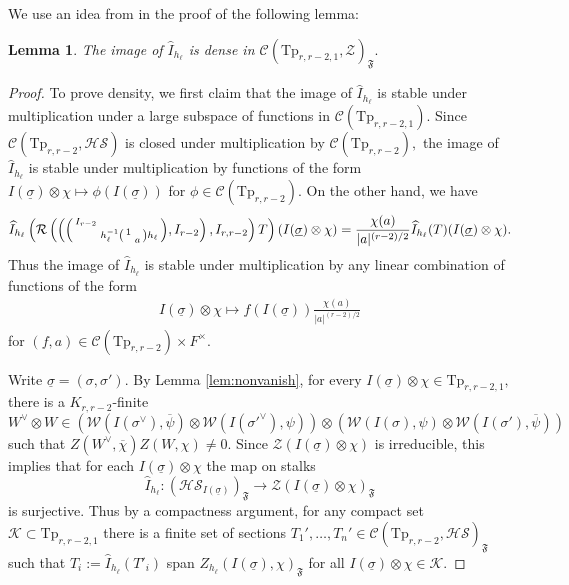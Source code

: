 \documentclass[12pt]{amsart}
\newtheorem{lem}[thm]{Lemma}
\theoremstyle{remark}
\numberwithin{equation}{section}
\newcommand{\lto}{\longrightarrow}
\theoremstyle{definition}
\newenvironment{psmatrix}
  {\left(\begin{smallmatrix}}
  {\end{smallmatrix}\right)}
\renewcommand{\bar}{\overline}
\numberwithin{equation}{subsection}
\begin{document}
We use an idea from \cite{RB:quest} in the proof of the following lemma:
\begin{lem}\label{lem:dense}
The image of $\widehat{I}_{h_\ell}$ is dense in $\mathcal{C}(\mathrm{Tp}_{r,r-2,1},\mathcal{Z})_{\mathfrak{F}}.$
\end{lem}

\begin{proof}
To prove density, we first claim that the image of $\widehat{I}_{h_\ell}$ is stable under multiplication under a large subspace of functions in $\mathcal{C}(\mathrm{Tp}_{r,r-2,1})$. Since $\mathcal{C}(\mathrm{Tp}_{r,r-2},\mathcal{HS})$ is closed under multiplication by $\mathcal{C}(\mathrm{Tp}_{r,r-2}),$ the image of $\widehat{I}_{h_\ell}$ is stable under multiplication by functions of the form $I(\underline{\sigma}) \otimes \chi \mapsto \phi(I(\underline{\sigma}))$ for $\phi \in \mathcal{C}(\mathrm{Tp}_{r,r-2}).$  On the other hand, we have 
\begin{align*} 
\widehat{I}_{h_\ell}\left(\mathcal{R}\left(\left(\begin{psmatrix} I_{r-2} & \\& h_\ell^{-1}\begin{psmatrix} 1 & \\ & a \end{psmatrix}h_\ell\end{psmatrix},I_{r-2} \right),I_{r,r-2}\right)T\right)(I(\underline{\sigma}) \otimes \chi)=\frac{\chi(a)}{|a|^{(r-2)/2}}\widehat{I}_{h_\ell}(T)(I(\underline{\sigma}) \otimes \chi).
\end{align*}
Thus the image of $\widehat{I}_{h_\ell}$ is stable under multiplication by any linear combination of functions of the form
\begin{align} \label{of:the:form}
I(\underline{\sigma}) \otimes \chi \longmapsto f(I(\underline{\sigma}))\frac{\chi(a)}{|a|^{(r-2)/2}}
\end{align}
for $(f,a) \in \mathcal{C}(\mathrm{Tp}_{r,r-2}) \times F^\times.$



Write $\underline{\sigma}=(\sigma,\sigma').$ By Lemma \ref{lem:nonvanish}, for every $I(\underline{\sigma}) \otimes \chi \in \mathrm{Tp}_{r,r-2,1},$ there is a $K_{r,r-2}$-finite 
$$
W^\vee \otimes  W\in \left(\mathcal{W}(I(\sigma^\vee),\overline{\psi})\otimes\mathcal{W}(I(\sigma'^\vee),\psi)\right) \otimes \left(\mathcal{W}(I(\sigma),\psi)\otimes\mathcal{W}(I(\sigma'),\overline{\psi})\right)
$$
such that $Z(W^\vee,\bar{\chi})Z(W,\chi) \neq 0.$  Since $\mathcal{Z}(I(\underline{\sigma})\otimes \chi)$ is irreducible, this implies that for each $I(\underline{\sigma}) \otimes \chi$ the map on stalks 
$$
\widehat{I}_{h_\ell}:(\mathcal{HS}_{I(\underline{\sigma})})_{\mathfrak{F}} \lto \mathcal{Z}(I(\underline{\sigma}) \otimes \chi)_{\mathfrak{F}}
$$
is surjective.  Thus by a compactness argument, for any compact set $\mathcal{K} \subset \mathrm{Tp}_{r,r-2,1}$ there is a finite set of sections $T_1',\dots,T_n' \in \mathcal{C}(\mathrm{Tp}_{r,r-2},\mathcal{HS})_{\mathfrak{F}}$ such that $T_i:=\widehat{I}_{h_\ell}(T'_i)$ span $Z_{h_\ell}(I(\underline{\sigma}),\chi)_{\mathfrak{F}}$ for all $I(\underline{\sigma}) \otimes \chi \in \mathcal{K}.$ 




\end{proof}
\end{document}
